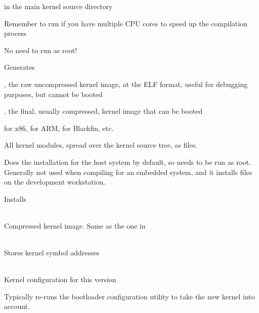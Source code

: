   \startitemize
  \item {}
    \startitemize
    \item in the main kernel source directory
    \item Remember to run  if you have multiple CPU
      cores to speed up the compilation process
    \item No need to run as root!
    \stopitemize
  \item Generates
    \startitemize
    \item {}, the raw uncompressed kernel image, at the
      ELF format, useful for debugging purposes, but cannot be booted
    \item {}, the final, usually
      compressed, kernel image that can be booted
      \startitemize
      \item {} for x86,  for ARM,
         for Blackfin, etc.
      \stopitemize
    \item All kernel modules, spread over the kernel source tree, as
       files.
    \stopitemize
  \stopitemize

  \startitemize
  \item {}
    \startitemize
    \item Does the installation for the host system by default, so
      needs to be run as root. Generally not used when compiling for
      an embedded system, and it installs files on the development
      workstation.
    \stopitemize
  \item Installs
    \startitemize
    \item {} \\
      Compressed kernel image. Same as the one in
    \item {}\\
      Stores kernel symbol addresses
    \item {}\\
      Kernel configuration for this version
    \stopitemize
  \item Typically re-runs the bootloader configuration utility to take
    the new kernel into account.
  \stopitemize

